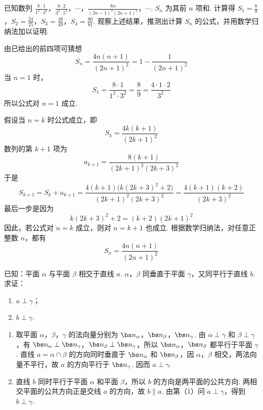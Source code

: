 \begin{problem}
已知数列 \(\frac{8\cdot 1}{1^2\cdot 3^2}\)，\(\frac{8\cdot 2}{3^2\cdot 5^2}\)，\(\cdots\)，\(\frac{8n}{(2n-1)^2(2n+1)^2}\)，\(\cdots\). \(S_n\) 为其前 \(n\) 项和. 计算得 \(S_1=\frac{8}{9}\)，\(S_2=\frac{24}{25}\)，\(S_3=\frac{48}{49}\)，\(S_4=\frac{80}{81}\). 观察上述结果，推测出计算 \(S_n\) 的公式，并用数学归纳法加以证明.
\end{problem}

\begin{solution}
由已给出的前四项可猜想
\[
S_n=\frac{4n(n+1)}{(2n+1)^2}=1-\frac{1}{(2n+1)^2}
\]
当 \(n=1\) 时，
\[
S_1=\frac{8\cdot1}{1^2\cdot3^2}=\frac{8}{9}=\frac{4\cdot1\cdot2}{3^2}
\]
所以公式对 \(n=1\) 成立.

假设当 \(n=k\) 时公式成立，即
\[
S_k=\frac{4k(k+1)}{(2k+1)^2}
\]
数列的第 \(k+1\) 项为
\[
a_{k+1}=\frac{8(k+1)}{(2k+1)^2(2k+3)^2}
\]
于是
\[
S_{k+1}=S_k+a_{k+1}
=\frac{4(k+1)\bigl(k(2k+3)^2+2\bigr)}{(2k+1)^2(2k+3)^2}
=\frac{4(k+1)(k+2)}{(2k+3)^2}
\]
最后一步是因为
\[
k(2k+3)^2+2=(k+2)(2k+1)^2
\]
因此，若公式对 \(n=k\) 成立，则对 \(n=k+1\) 也成立. 根据数学归纳法，对任意正整数 \(n\)，都有
\[
\boxed{S_n=\frac{4n(n+1)}{(2n+1)^2}}
\]
\end{solution}

\begin{problem}
已知：平面 \(\alpha\) 与平面 \(\beta\) 相交于直线 \(a\). \(\alpha\)，\(\beta\) 同垂直于平面 \(\gamma\)，又同平行于直线 \(b\). 求证：

\begin{enumerate}
\item \(a\perp\gamma\)；
\item \(b\perp\gamma\).
\end{enumerate}
\end{problem}

\begin{solution}
\begin{enumerate}
\item 取平面 \(\alpha\)，\(\beta\)，\(\gamma\) 的法向量分别为 \(\bs n_\alpha\)，\(\bs n_\beta\)，\(\bs n_\gamma\). 由 \(\alpha\perp\gamma\) 和 \(\beta\perp\gamma\)，有 \(\bs n_\alpha\perp\bs n_\gamma\)，\(\bs n_\beta\perp\bs n_\gamma\)，所以 \(\bs n_\alpha\)，\(\bs n_\beta\) 都平行于平面 \(\gamma\). 直线 \(a=\alpha\cap\beta\) 的方向同时垂直于 \(\bs n_\alpha\) 和 \(\bs n_\beta\)，因 \(\alpha\)，\(\beta\) 相交，两法向量不平行，故 \(a\) 的方向平行于 \(\bs n_\gamma\). 因而 \(a\perp\gamma\).

\item 直线 \(b\) 同时平行于平面 \(\alpha\) 和平面 \(\beta\)，所以 \(b\) 的方向是两平面的公共方向. 两相交平面的公共方向正是交线 \(a\) 的方向，故 \(b\parallel a\). 由第（1）问 \(a\perp\gamma\)，得到 \(b\perp\gamma\).
\end{enumerate}
\end{solution}

